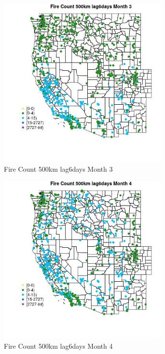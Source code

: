 \begin{figure} 
\centering  
\includegraphics[width=0.77\textwidth]{Code_Outputs/Report_ML_input_PM25_Step4_part_f_de_duplicated_aveswNAs_MapObsMo3Fire_Count_500km_lag6days.jpg} 
\caption{\label{fig:Report_ML_input_PM25_Step4_part_f_de_duplicated_aveswNAsMapObsMo3Fire_Count_500km_lag6days}Fire Count 500km lag6days Month 3} 
\end{figure} 
 

\clearpage 

\begin{figure} 
\centering  
\includegraphics[width=0.77\textwidth]{Code_Outputs/Report_ML_input_PM25_Step4_part_f_de_duplicated_aveswNAs_MapObsMo4Fire_Count_500km_lag6days.jpg} 
\caption{\label{fig:Report_ML_input_PM25_Step4_part_f_de_duplicated_aveswNAsMapObsMo4Fire_Count_500km_lag6days}Fire Count 500km lag6days Month 4} 
\end{figure} 
 

